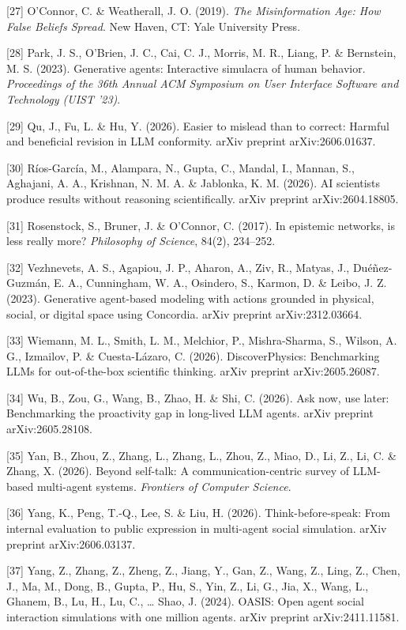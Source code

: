 \documentclass[pdflatex,sn-basic]{sn-jnl}
\begin{document}
{[}27{]} O'Connor, C. \& Weatherall, J. O. (2019). \emph{The Misinformation Age: How False Beliefs Spread}. New Haven, CT: Yale University Press.

{[}28{]} Park, J. S., O'Brien, J. C., Cai, C. J., Morris, M. R., Liang, P. \& Bernstein, M. S. (2023). Generative agents: Interactive simulacra of human behavior. \emph{Proceedings of the 36th Annual ACM Symposium on User Interface Software and Technology (UIST '23)}.

{[}29{]} Qu, J., Fu, L. \& Hu, Y. (2026). Easier to mislead than to correct: Harmful and beneficial revision in LLM conformity. arXiv preprint arXiv:2606.01637.

{[}30{]} Ríos-García, M., Alampara, N., Gupta, C., Mandal, I., Mannan, S., Aghajani, A. A., Krishnan, N. M. A. \& Jablonka, K. M. (2026). AI scientists produce results without reasoning scientifically. arXiv preprint arXiv:2604.18805.

{[}31{]} Rosenstock, S., Bruner, J. \& O'Connor, C. (2017). In epistemic networks, is less really more? \emph{Philosophy of Science}, 84(2), 234--252.

{[}32{]} Vezhnevets, A. S., Agapiou, J. P., Aharon, A., Ziv, R., Matyas, J., Duéñez-Guzmán, E. A., Cunningham, W. A., Osindero, S., Karmon, D. \& Leibo, J. Z. (2023). Generative agent-based modeling with actions grounded in physical, social, or digital space using Concordia. arXiv preprint arXiv:2312.03664.

{[}33{]} Wiemann, M. L., Smith, L. M., Melchior, P., Mishra-Sharma, S., Wilson, A. G., Izmailov, P. \& Cuesta-Lázaro, C. (2026). DiscoverPhysics: Benchmarking LLMs for out-of-the-box scientific thinking. arXiv preprint arXiv:2605.26087.

{[}34{]} Wu, B., Zou, G., Wang, B., Zhao, H. \& Shi, C. (2026). Ask now, use later: Benchmarking the proactivity gap in long-lived LLM agents. arXiv preprint arXiv:2605.28108.

{[}35{]} Yan, B., Zhou, Z., Zhang, L., Zhang, L., Zhou, Z., Miao, D., Li, Z., Li, C. \& Zhang, X. (2026). Beyond self-talk: A communication-centric survey of LLM-based multi-agent systems. \emph{Frontiers of Computer Science}.

{[}36{]} Yang, K., Peng, T.-Q., Lee, S. \& Liu, H. (2026). Think-before-speak: From internal evaluation to public expression in multi-agent social simulation. arXiv preprint arXiv:2606.03137.

{[}37{]} Yang, Z., Zhang, Z., Zheng, Z., Jiang, Y., Gan, Z., Wang, Z., Ling, Z., Chen, J., Ma, M., Dong, B., Gupta, P., Hu, S., Yin, Z., Li, G., Jia, X., Wang, L., Ghanem, B., Lu, H., Lu, C., \ldots{} Shao, J. (2024). OASIS: Open agent social interaction simulations with one million agents. arXiv preprint arXiv:2411.11581.
\end{document}

